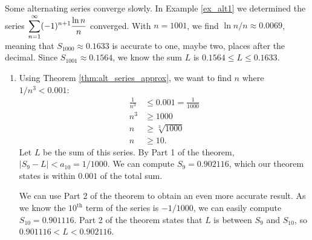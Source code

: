 Some alternating series converge slowly. In Example \ref{ex_alt1} we determined the series $\displaystyle\sum_{n=1}^\infty (-1)^{n+1}\frac{\ln n}{n}$ converged. With $n=1001$, we find $\ln n/n \approx 0.0069$, meaning that $S_{1000} \approx 0.1633$ is accurate to one, maybe two, places after the decimal. Since $S_{1001} \approx 0.1564$, we know the sum $L$ is $0.1564\leq L\leq0.1633$.\\

{\begin{enumerate}
	\item  Using Theorem \ref{thm:alt_series_approx}, we want to find $n$ where $1/n^3 < 0.001$:
	\begin{align*}
	\frac1{n^3} &\leq 0.001=\frac{1}{1000} \\
	n^3 &\geq 1000\\
	n &\geq \sqrt[3]{1000}\\
	n &\geq 10.
	\end{align*}
	Let $L$ be the sum of this series. By Part 1 of the theorem, $|S_9-L|<a_{10} = 1/1000$. We can compute $S_9=0.902116$, which our theorem states is within $0.001$ of the total sum. 
	
	We can use Part 2 of the theorem to obtain an even more accurate result. As we know the $10^\text{th}$ term of the series is $-1/1000$, we can easily compute $S_{10} = 0.901116$. Part 2 of the theorem states that $L$ is between $S_9$ and $S_{10}$, so $0.901116 <L<0.902116$.
	

\end{enumerate}}
